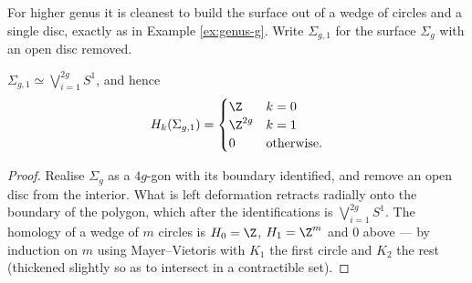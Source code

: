 For higher genus it is cleanest to build the surface out of a wedge of circles and a
single disc, exactly as in Example \ref{ex:genus-g}. Write $\Sigma_{g,1}$ for the surface
$\Sigma_g$ with an open disc removed.

\begin{lemma} \label{lem:punctured-surface}
	$\Sigma_{g,1} \simeq \bigvee_{i=1}^{2g}S^1$, and hence
	$$
	H_k(\Sigma_{g,1}) = \begin{cases}\Z & k=0\\ \Z^{2g} & k=1\\ 0 & \text{otherwise.}\end{cases}
	$$
\end{lemma}
\begin{proof}
	Realise $\Sigma_g$ as a $4g$-gon with its boundary identified, and remove an open disc from the interior. What is left deformation retracts radially onto the boundary of the polygon, which after the identifications is $\bigvee_{i=1}^{2g}S^1$. The homology of a wedge of $m$ circles is $H_0 = \Z$, $H_1 = \Z^m$ and $0$ above --- by induction on $m$ using Mayer--Vietoris with $K_1$ the first circle and $K_2$ the rest (thickened slightly so as to intersect in a contractible set).
\end{proof}

